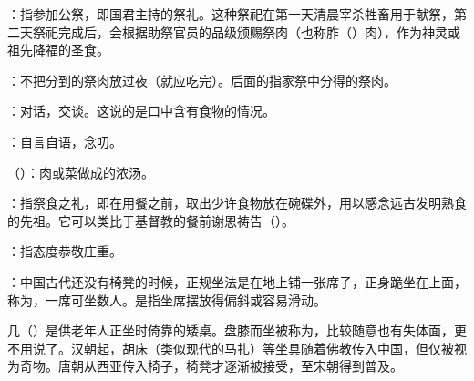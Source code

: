 {
\item {}：指参加公祭，即国君主持的祭礼。这种祭祀在第一天清晨宰杀牲畜用于献祭，第二天祭祀完成后，会根据助祭官员的品级颁赐祭肉（也称胙（）肉），作为神灵或祖先降福的圣食。
\item {}：不把分到的祭肉放过夜（就应吃完）。后面的指家祭中分得的祭肉。
}
{}


{
\item {}：对话，交谈。这说的是口中含有食物的情况。

：自言自语，念叨。
}
{}


{
\item {}（）：肉或菜做成的浓汤。
\item {}：指祭食之礼，即在用餐之前，取出少许食物放在碗碟外，用以感念远古发明熟食的先祖。它可以类比于基督教的餐前谢恩祷告（）。
\item {}：指态度恭敬庄重。
}
{}


{
\item {}：中国古代还没有椅凳的时候，正规坐法是在地上铺一张席子，正身跪坐在上面，称为，一席可坐数人。是指坐席摆放得偏斜或容易滑动。

几（）是供老年人正坐时倚靠的矮桌。盘膝而坐被称为，比较随意也有失体面，更不用说了。汉朝起，胡床（类似现代的马扎）等坐具随着佛教传入中国，但仅被视为奇物。唐朝从西亚传入椅子，椅凳才逐渐被接受，至宋朝得到普及。
}
{}


